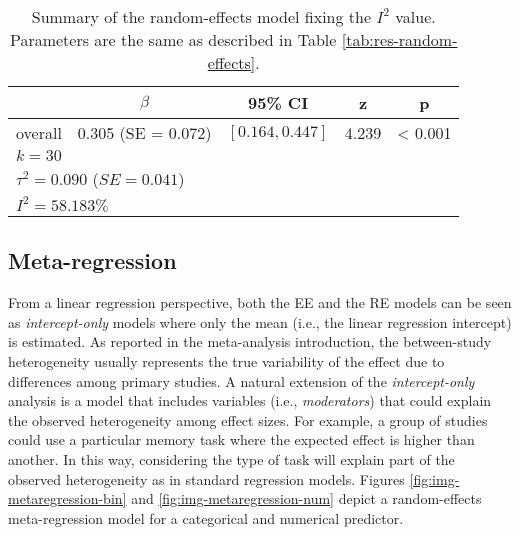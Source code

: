\documentclass[
  man,floatsintext]{apa6}
\begin{document}
\begin{table}[H]

\caption{\label{tab:res-random-effects-i2}Summary of the random-effects model fixing the \(I^2\) value. Parameters are the same as described in Table \ref{tab:res-random-effects}.}
\centering
\fontsize{9}{11}\selectfont
\begin{tabular}[t]{ccccc}
\toprule
 & $\beta$ & 95\% CI & z & p\\
\midrule
overall & 0.305 (SE = 0.072) & $[0.164, 0.447]$ & 4.239 & < 0.001\\
\bottomrule
\multicolumn{5}{l}{\textsuperscript{} $k = 30$}\\
\multicolumn{5}{l}{\textsuperscript{} $\tau^2 = 0.090$ ($SE = 0.041$)}\\
\multicolumn{5}{l}{\textsuperscript{} $I^2 = 58.183\%$}\\
\end{tabular}
\end{table}

\normalsize

\subsection{Meta-regression}\label{metareg}

From a linear regression perspective, both the EE and the RE models can be seen as \emph{intercept-only} models where only the mean (i.e., the linear regression intercept) is estimated. As reported in the meta-analysis introduction, the between-study heterogeneity usually represents the true variability of the effect due to differences among primary studies. A natural extension of the \emph{intercept-only} analysis is a model that includes variables (i.e., \emph{moderators}) that could explain the observed heterogeneity among effect sizes. For example, a group of studies could use a particular memory task where the expected effect is higher than another. In this way, considering the type of task will explain part of the observed heterogeneity as in standard regression models. Figures \ref{fig:img-metaregression-bin} and \ref{fig:img-metaregression-num} depict a random-effects meta-regression model for a categorical and numerical predictor.

\scriptsize
\end{document}
